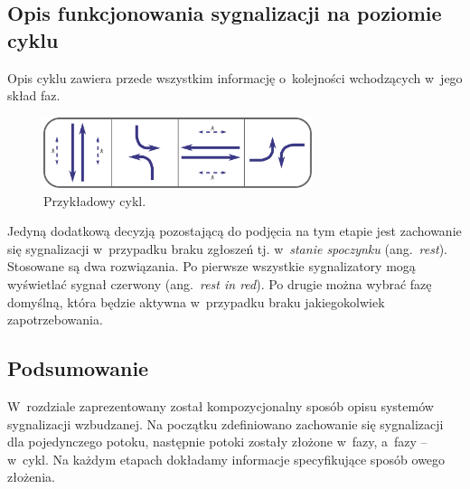 \documentclass{pracamgr}
\newcommand{\ang}[1]{(ang.~\emph{#1})}
\theoremstyle{plain}
\begin{document}
\subsection{Opis funkcjonowania sygnalizacji na poziomie cyklu}
Opis cyklu zawiera przede wszystkim informację o~kolejności
wchodzących w~jego skład faz.
\begin{figure} \centering
  \includegraphics[width=0.7\textwidth]{img/signals-cycle-example}
  \caption{Przykładowy cykl.}
\end{figure}
Jedyną dodatkową decyzją pozostającą do podjęcia na tym etapie jest
zachowanie się sygnalizacji w~przypadku braku zgłoszeń tj.
w~\emph{stanie spoczynku} \ang{rest}. Stosowane są dwa rozwiązania. Po
pierwsze wszystkie sygnalizatory mogą wyświetlać sygnał czerwony
\ang{rest in red}. Po drugie można wybrać fazę domyślną, która będzie
aktywna w~przypadku braku jakiegokolwiek zapotrzebowania.

\subsection{Podsumowanie}

W~rozdziale zaprezentowany został kompozycjonalny sposób opisu
systemów sygnalizacji wzbudzanej. Na początku zdefiniowano zachowanie
się sygnalizacji dla pojedynczego potoku, następnie potoki zostały
złożone w~fazy, a~fazy -- w~cykl. Na każdym etapach dokładamy
informacje specyfikujące sposób owego złożenia.
\end{document}
